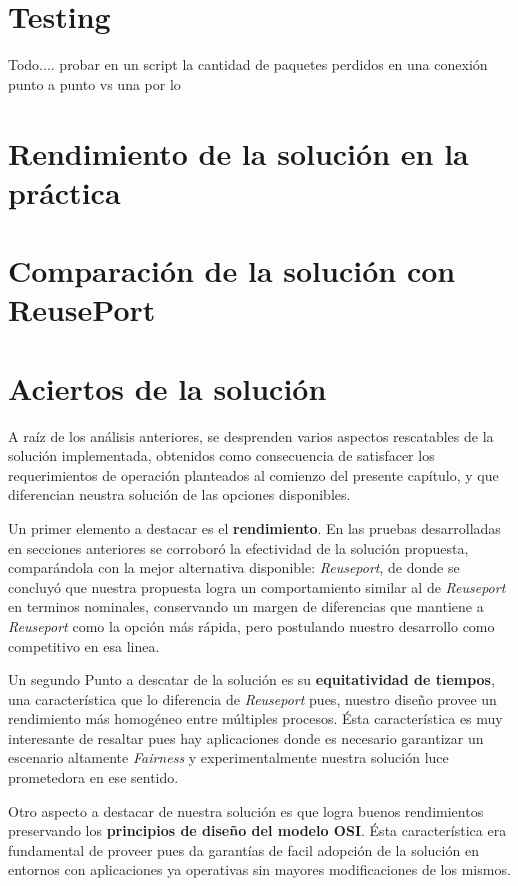 \section{Testing}
Todo.... probar en un script la cantidad de paquetes perdidos en una conexión punto a punto vs una por lo

\section{Rendimiento de la solución en la práctica}

\section{Comparación de la solución con ReusePort}

\section{Aciertos de la solución}

A raíz de los análisis anteriores, se desprenden varios aspectos rescatables de la solución implementada, obtenidos como consecuencia de satisfacer los requerimientos de operación planteados al comienzo del presente capítulo, y que diferencian neustra solución de las opciones disponibles.

Un primer elemento a destacar es el \textbf{rendimiento}. En las pruebas desarrolladas en secciones anteriores se corroboró la efectividad de la solución propuesta, comparándola con la mejor alternativa disponible: \emph{Reuseport}, de donde se concluyó que nuestra propuesta logra un comportamiento similar al de \emph{Reuseport} en terminos nominales, conservando un margen de diferencias que mantiene a \emph{Reuseport} como la opción más rápida, pero postulando nuestro desarrollo como competitivo en esa linea.

Un segundo Punto a descatar de la solución es su \textbf{equitatividad de tiempos}, una característica que lo diferencia de \emph{Reuseport} pues, nuestro diseño provee un rendimiento más homogéneo entre múltiples procesos. Ésta característica es muy interesante de resaltar pues hay aplicaciones donde es necesario garantizar un escenario altamente \emph{Fairness} y experimentalmente nuestra solución luce prometedora en ese sentido.

Otro aspecto a destacar de nuestra solución es que logra buenos rendimientos preservando los \textbf{principios de diseño del modelo OSI}. Ésta característica era fundamental de proveer pues da garantías de facil adopción de la solución en entornos con aplicaciones ya operativas sin mayores modificaciones de los mismos.

